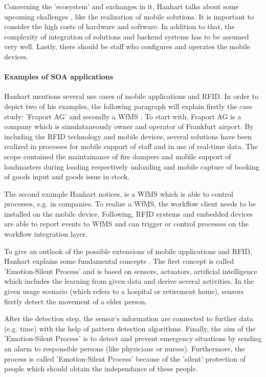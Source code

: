 Concerning the 'ecosystem' and exchanges in it, Hanhart talks about some upcoming challenges \cite[p.212 ff.]{mobile}, like the realization of mobile solutions. It is important to consider the high costs of hardware and software. In addition to that, the complexity of integration of solutions and backend systems has to be assumed very well. Lastly, there should be staff who configures and operates the mobile devices.  

\paragraph{Examples of SOA applications}

Hanhart mentions several use cases of mobile applications and RFID. In order to depict two of his examples, the following paragraph will explain firstly the case study: 'Fraport AG' \cite[p.39 ff.]{mobile} and secondly a \ac{WfMS} \cite[p.204 ff.]{mobile}. To start with, Fraport AG is a company which is simulataneously owner and operator of Frankfurt airport. By including the RFID technology and mobile devices, several solutions have been realized in processes for mobile support of staff and in use of real-time data. The scope contained the maintainance of fire dampers and mobile support of loadmasters during loading respectively unloading and mobile capture of booking of goods input and goods issue in stock. 

The second example Hanhart notices, is a WfMS \cite[p.204 ff.]{mobile} which is able to control processes, e.g. in companies. To realize a WfMS, the workflow client needs to be installed on the mobile device. Following, RFID systems and embedded devices are able to report events to WfMS and can trigger or control processes on the workflow integration layer.
     
To give an outlook of the possible extensions of mobile applications and RFID, Hanhart explains some fundamental concepts \cite[p.208 ff.]{mobile}. The first concept is called 'Emotion-Silent Process' and is based on sensors, actuators, artificial intelligence which includes the learning from given data and derive several activities. In the given usage scenario (which refers to a hospital or retirement home), sensors firstly detect the movement of a elder person.

After the detection step, the sensor's information are connected to further data (e.g. time) with the help of pattern detection algorithms. Finally, the aim of the 'Emotion-Silent Process' is to detect and prevent emergency situations by sending an alarm to responsible persons (like physicians or nurses). Furthermore, the process is called 'Emotion-Silent Process' because of the 'silent' protection of people which should obtain the independance of these people.

